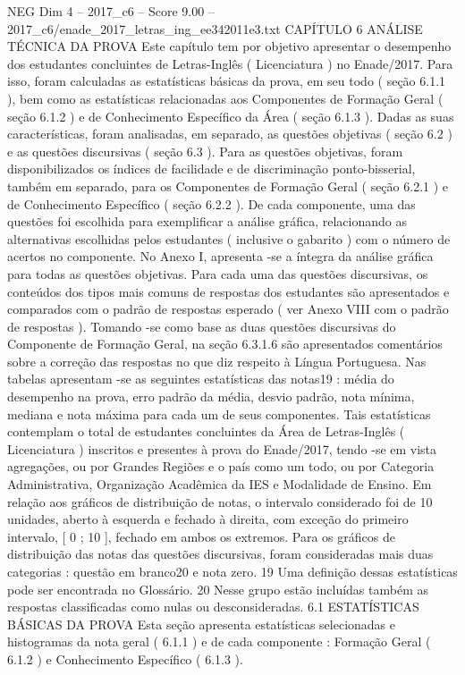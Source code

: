 \begin{textsample}{NEG Dim 4 – 2017\_c6 – Score 9.00 – 2017\_c6/enade\_2017\_letras\_ing\_ee342011e3.txt}  \label{ex:f4_neg_326}
CAPÍTULO 6 ANÁLISE TÉCNICA DA PROVA Este capítulo tem por objetivo apresentar o desempenho dos estudantes concluintes de Letras-Inglês ( Licenciatura ) no Enade/2017.
Para isso, foram calculadas as estatísticas básicas da prova, em seu todo ( seção 6.1.1 ), bem como as estatísticas relacionadas aos Componentes de Formação Geral ( seção 6.1.2 ) e de Conhecimento Específico da Área ( seção 6.1.3 ).
Dadas as suas características, foram analisadas, em separado, as questões objetivas ( seção 6.2 ) e as questões discursivas ( seção 6.3 ).
Para as questões objetivas, foram disponibilizados os índices de facilidade e de discriminação ponto-bisserial, também em separado, para os Componentes de Formação Geral ( seção 6.2.1 ) e de Conhecimento Específico ( seção 6.2.2 ).
De cada componente, uma das questões foi escolhida para exemplificar a análise gráfica, relacionando as alternativas escolhidas pelos estudantes ( inclusive o gabarito ) com o número de acertos no componente.
No Anexo I, apresenta -se a íntegra da análise gráfica para todas as questões objetivas.
Para cada uma das questões discursivas, os conteúdos dos tipos mais comuns de respostas dos estudantes são apresentados e comparados com o padrão de respostas esperado ( ver Anexo VIII com o padrão de respostas ).
Tomando -se como base as duas questões discursivas do Componente de Formação Geral, na seção 6.3.1.6 são apresentados comentários sobre a correção das respostas no que diz respeito à Língua Portuguesa.
Nas tabelas apresentam -se as seguintes estatísticas das notas19 : média do desempenho na prova, erro padrão da média, desvio padrão, nota mínima, mediana e nota máxima para cada um de seus componentes.
Tais estatísticas contemplam o total de estudantes concluintes da Área de Letras-Inglês ( Licenciatura ) inscritos e presentes à prova do Enade/2017, tendo -se em vista agregações, ou por Grandes Regiões e o país como um todo, ou por Categoria Administrativa, Organização Acadêmica da IES e Modalidade de Ensino.
Em relação aos gráficos de distribuição de notas, o intervalo considerado foi de 10 unidades, aberto à esquerda e fechado à direita, com exceção do primeiro intervalo, [ 0 ; 10 ], fechado em ambos os extremos.
Para os gráficos de distribuição das notas das questões discursivas, foram consideradas mais duas categorias : questão em branco20 e nota zero. 19 Uma definição dessas estatísticas pode ser encontrada no Glossário. 20 Nesse grupo estão incluídas também as respostas classificadas como nulas ou desconsideradas. 6.1 ESTATÍSTICAS BÁSICAS DA PROVA Esta seção apresenta estatísticas selecionadas e histogramas da nota geral ( 6.1.1 ) e de cada componente : Formação Geral ( 6.1.2 ) e Conhecimento Específico ( 6.1.3 ).

\end{textsample}
